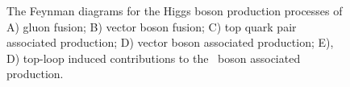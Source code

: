 \begin{figure}[htbp]
{     \qquad
  }
  \caption[Higgs Boson Production Diagrams]{The Feynman diagrams for the Higgs boson production processes of A) gluon fusion; B) vector boson fusion; C) top quark pair associated production; D) vector boson associated production; E), D) top-loop induced contributions to the \bosZ\ boson associated production.}
  \label{fig:higgsprodfeyn}
\end{figure}

